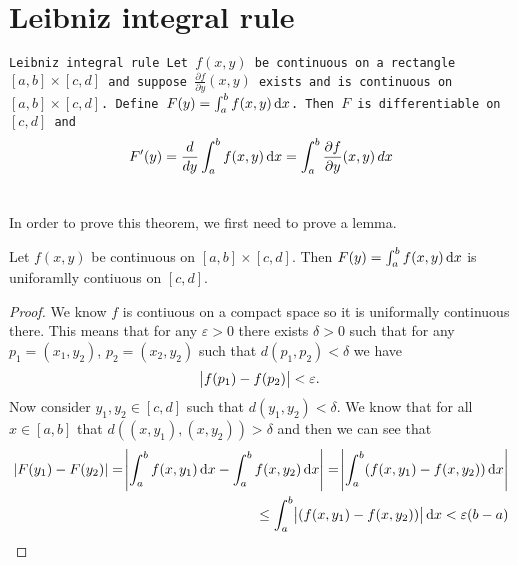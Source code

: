 \documentclass[11pt,a4paper]{article}
\begin{document}
	\newpage
	
	\section{Leibniz integral rule}
  \begin{theorem}\label{thm:leibniz-integral-rule}\tt{Leibniz integral rule}
    Let $f(x,y)$ be continuous on a rectangle $[a,b] \times [c,d]$ 
    and suppose $\frac{\partial f}{\partial y}(x,y)$ exists and is continuous 
    on $[a,b] \times [c,d]$. 
    Define $F(y) = \int_a^b{f(x,y)}\dx$.
    Then $F$ is differentiable on $[c,d]$ and
    \[
      F'(y) =
      \frac{d}{dy}\int_a^b{f(x,y)}\dx =
      \int_{a}^{b}{\frac{\partial f}{\partial y}(x,y)\, dx}
    \]
  \end{theorem}
  
  In order to prove this theorem, we first need to prove a lemma.
  \begin{lemma}
    Let $f(x,y)$ be continuous on $[a,b] \times [c,d]$.
    Then $F(y) = \int_{a}^{b} f(x,y)\dx$ is uniforamlly contiuous on $[c,d]$.
  \end{lemma}
  \begin{proof}
    We know $f$ is contiuous on a compact space so it is uniformally continuous 
    there. This means that for any $\varepsilon > 0$ there exists $\delta > 0$
    such that for any $p_1 = (x_1,y_2)$, $p_2 = (x_2,y_2)$ such that 
    $d(p_1,p_2) < \delta$ we have
    \[
      \abs{f(p_1) - f(p_2)} < \varepsilon.
    \]
    Now consider $y_1, y_2 \in[c,d]$ such that $d(y_1,y_2) < \delta$.
    We know that for all $x \in [a,b]$ that $d((x,y_1),(x,y_2)) > \delta$
    and then we can see that
    \begin{align*}
      |F(y_1)-F(y_2)| 
      = \abs{\int_{a}^{b} f(x,y_1)\dx - \int_a^b{f(x,y_2)\dx}}
      = \abs{\int_{a}^{b} (f(x,y_1) - f(x,y_2))\dx} \\
      \le \int_{a}^{b} \abs{(f(x,y_1) - f(x,y_2))}\dx < \varepsilon(b - a)
    \end{align*}
  \end{proof}
\end{document}
